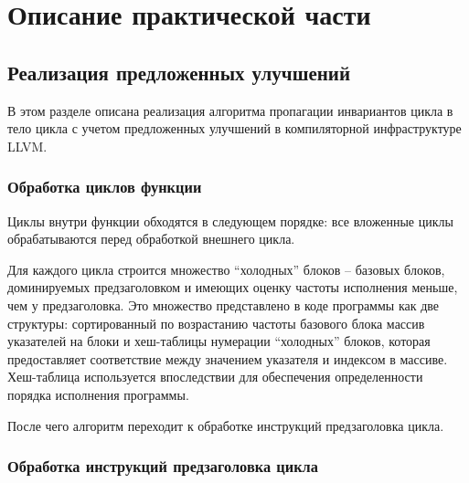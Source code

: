 \chapter{Описание практической части}
\label{sec:Chapter4} 

\section{Реализация предложенных улучшений}

В этом разделе описана реализация алгоритма пропагации инвариантов цикла в тело цикла с учетом предложенных улучшений в компиляторной инфраструктуре LLVM.

\subsection{Обработка циклов функции}

Циклы внутри функции обходятся в следующем порядке: все вложенные циклы обрабатываются перед обработкой внешнего цикла.

Для каждого цикла строится множество \enquote{холодных} блоков -- базовых блоков, доминируемых предзаголовком и имеющих оценку частоты исполнения меньше, чем у предзаголовка.
Это множество представлено в коде программы как две структуры: сортированный по возрастанию частоты базового блока массив указателей на блоки и хеш-таблицы нумерации \enquote{холодных} блоков, которая предоставляет соответствие между значением указателя и индексом в массиве.
Хеш-таблица используется впоследствии для обеспечения определенности порядка исполнения программы.

После чего алгоритм переходит к обработке инструкций предзаголовка цикла.

\subsection{Обработка инструкций предзаголовка цикла}

